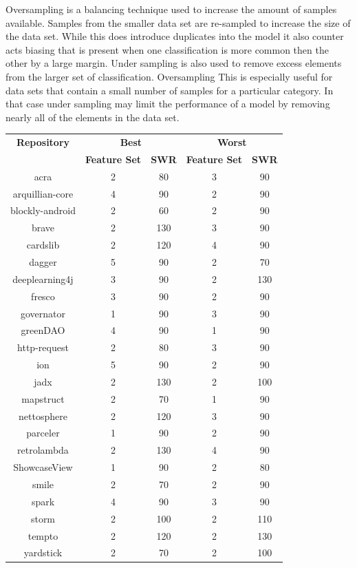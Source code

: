 Oversampling is a balancing technique used to increase the amount of samples available. Samples from the smaller data set are re-sampled to increase the size of the data set. While this does introduce duplicates into the model it also counter acts biasing that is present when one classification is more common then the other by a large margin. Under sampling is also used to remove excess elements from the larger set of classification. Oversampling This is especially useful for data sets that contain a small number of samples for a particular category. In that case under sampling may limit the performance of a model by removing nearly all of the elements in the data set.

\begin{table}[ht]
\begin{center}

    \begin{tabular}{|c|c|c|c|c|}
        \hline
        \textbf{Repository} & \multicolumn{2}{c|}{\textbf{Best}} & \multicolumn{2}{c|}{\textbf{Worst}} \\ \cline{2-5}
         & \textbf{Feature Set} & \textbf{SWR} & \textbf{Feature Set} & \textbf{SWR} \\ 
        \hline
        acra & 2 & 80 & 3 & 90 \\
        arquillian-core & 4 & 90 & 2 & 90 \\
        blockly-android & 2 & 60 & 2 & 90 \\
        brave & 2 & 130 & 3 & 90 \\
        cardslib & 2 & 120 & 4 & 90 \\
        dagger & 5 & 90 & 2 & 70 \\
        deeplearning4j & 3 & 90 & 2 & 130 \\
        fresco & 3 & 90 & 2 & 90 \\
        governator & 1 & 90 & 3 & 90 \\
        greenDAO & 4 & 90 & 1 & 90 \\
        http-request & 2 & 80 & 3 & 90 \\
        ion & 5 & 90 & 2 & 90 \\
        jadx & 2 & 130 & 2 & 100 \\
        mapstruct & 2 & 70 & 1 & 90 \\
        nettosphere & 2 & 120 & 3 & 90 \\
        parceler & 1 & 90 & 2 & 90 \\
        retrolambda & 2 & 130 & 4 & 90 \\
        ShowcaseView & 1 & 90 & 2 & 80 \\
        smile & 2 & 70 & 2 & 90 \\
        spark & 4 & 90 & 3 & 90 \\
        storm & 2 & 100 & 2 & 110 \\
        tempto & 2 & 120 & 2 & 130 \\
        yardstick & 2 & 70 & 2 & 100 \\



\end{tabular}
\end{center}
\end{table}
